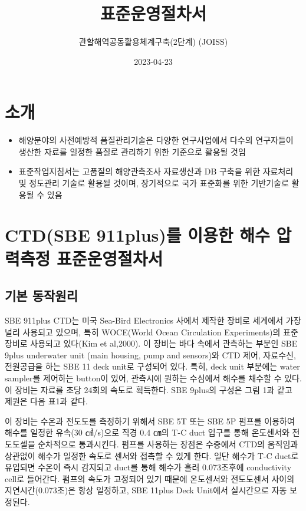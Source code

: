 \documentclass[
]{book}
\title{표준운영절차서}
\author{관할해역공동활용체계구축(2단계) (JOISS)}
\date{2023-04-23}
\providecommand{\tightlist}{%
  \setlength{\itemsep}{0pt}\setlength{\parskip}{0pt}}
\begin{document}
\maketitle

{
\setcounter{tocdepth}{1}
\tableofcontents
}
\hypertarget{uxc18cuxac1c}{%
\chapter{소개}\label{uxc18cuxac1c}}

\begin{itemize}
\tightlist
\item
  해양분야의 사전예방적 품질관리기술은 다양한 연구사업에서 다수의 연구자들이 생산한 자료를 일정한 품질로 관리하기 위한 기준으로 활용될 것임
\item
  표준작업지침서는 고품질의 해양관측조사 자료생산과 DB 구축을 위한 자료처리 및 정도관리 기술로 활용될 것이며, 장기적으로 국가 표준화를 위한 기반기술로 활용될 수 있음
\end{itemize}

\hypertarget{ctdsbe-911plusuxb97c-uxc774uxc6a9uxd55c-uxd574uxc218-uxc555uxb825uxce21uxc815-uxd45cuxc900uxc6b4uxc601uxc808uxcc28uxc11c}{%
\chapter{CTD(SBE 911plus)를 이용한 해수 압력측정 표준운영절차서}\label{ctdsbe-911plusuxb97c-uxc774uxc6a9uxd55c-uxd574uxc218-uxc555uxb825uxce21uxc815-uxd45cuxc900uxc6b4uxc601uxc808uxcc28uxc11c}}

\hypertarget{uxae30uxbcf8-uxb3d9uxc791uxc6d0uxb9ac}{%
\section{기본 동작원리}\label{uxae30uxbcf8-uxb3d9uxc791uxc6d0uxb9ac}}

SBE 911plus CTD는 미국 Sea-Bird Electronics 사에서 제작한 장비로 세계에서 가장 널리 사용되고 있으며, 특히 WOCE(World Ocean Circulation Experiments)의 표준장비로 사용되고 있다(Kim et al,2000). 이 장비는 바다 속에서 관측하는 부분인 SBE 9plus underwater unit (main housing, pump and sensors)와 CTD 제어, 자료수신, 전원공급을 하는 SBE 11 deck unit로 구성되어 있다. 특히, deck unit 부분에는 water sampler를 제어하는 button이 있어, 관측시에 원하는 수심에서 해수를 채수할 수 있다. 이 장비는 자료를 초당 24회의 속도로 획득한다. SBE 9plus의 구성은 그림 1과 같고 제원은 다음 표1과 같다.

이 장비는 수온과 전도도를 측정하기 위해서 SBE 5T 또는 SBE 5P 펌프를 이용하여 해수를 일정한 유속(30 ㎤/s)으로 직경 0.4 ㎝의 T-C duct 입구를 통해 온도센서와 전도도셀을 순차적으로 통과시킨다. 펌프를 사용하는 장점은 수중에서 CTD의 움직임과 상관없이 해수가 일정한 속도로 센서와 접촉할 수 있게 한다. 일단 해수가 T-C duct로 유입되면 수온이 즉시 감지되고 duct를 통해 해수가 흘러 0.073초후에 conductivity cell로 들어간다. 펌프의 속도가 고정되어 있기 때문에 온도센서와 전도도센서 사이의 지연시간(0.073초)은 항상 일정하고, SBE 11plus Deck Unit에서 실시간으로 자동 보정된다.
\end{document}

